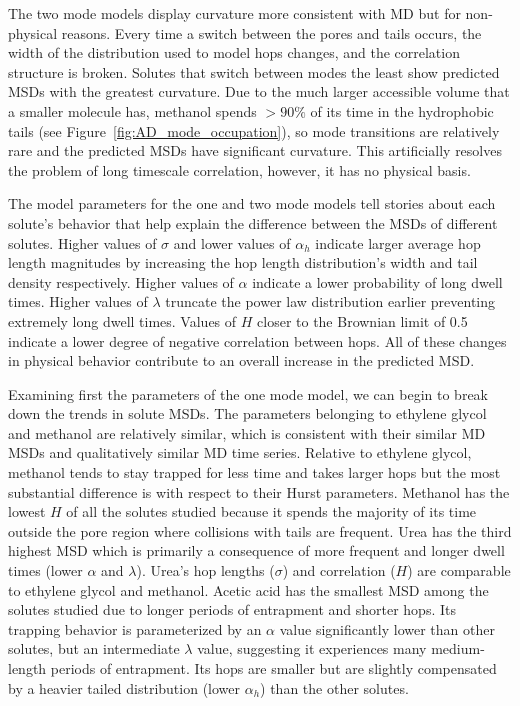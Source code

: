 \documentclass[journal=jctcce,manuscript=article]{achemso}
\begin{document}
  The two mode models display curvature more consistent with MD but for
  non-physical reasons. Every time a switch between the pores and tails occurs,
  the width of the distribution used to model hops changes, and the correlation structure is broken. 
  Solutes that switch between modes the least show
  predicted MSDs with the greatest curvature. Due to the much larger
  accessible volume that a smaller molecule has, methanol spends $>90\%$ of its
  time in the hydrophobic tails (see Figure~\ref{fig:AD_mode_occupation}), so
  mode transitions are relatively rare and the predicted MSDs have significant
  curvature. This artificially resolves the problem of long timescale
  correlation, however, it has no physical basis.
  
  The model parameters for the one and two mode models tell stories about each
  solute's behavior that help explain the difference between the MSDs of
  different solutes. Higher values of $\sigma$ and lower values of $\alpha_h$
  indicate larger average hop length magnitudes by increasing the hop length
  distribution's width and tail density respectively. Higher values of $\alpha$
  indicate a lower probability of long dwell times. Higher values of $\lambda$
  truncate the power law distribution earlier preventing extremely long dwell
  times. Values of $H$ closer to the Brownian limit of 0.5 indicate a lower
  degree of negative correlation between hops. All of these changes in physical
  behavior contribute to an overall increase in the predicted MSD.

  Examining first the parameters of the one mode model, we can begin to break
  down the trends in solute MSDs. The parameters belonging to ethylene glycol
  and methanol are relatively similar, which is consistent with their similar MD
  MSDs and qualitatively similar MD time series.
  Relative to ethylene glycol, methanol tends to stay trapped for less
  time and takes larger hops but the most substantial difference is with
  respect to their Hurst parameters. Methanol has the lowest $H$ of all the
  solutes studied because it spends the majority of its time outside the pore
  region where collisions with tails are frequent.
  Urea has the third highest MSD which is primarily a consequence of more
  frequent and longer dwell times (lower $\alpha$ and $\lambda$). Urea's hop
  lengths ($\sigma$) and correlation ($H$) are comparable to ethylene glycol
  and methanol. Acetic acid has the smallest MSD among the solutes studied due
  to longer periods of entrapment and shorter hops. Its trapping behavior is
  parameterized by an $\alpha$ value significantly lower than other solutes,
  but an intermediate $\lambda$ value, suggesting it experiences many
  medium-length periods of entrapment. Its hops are smaller but are slightly
  compensated by a heavier tailed distribution (lower $\alpha_h$) than the
  other solutes. 
  
\end{document}
